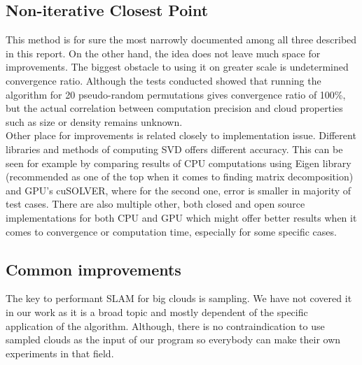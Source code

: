 \documentclass[titlepage]{article}
\begin{document}
\subsection{Non-iterative Closest Point}
This method is for sure the most narrowly documented among all three described in this report. On the other hand, the idea does not leave much space for improvements. The biggest obstacle to using it on greater scale is undetermined convergence ratio. Although the tests conducted showed that running the algorithm for 20 pseudo-random permutations gives convergence ratio of 100\%, but the actual correlation between computation precision and cloud properties such as size or density remains unknown.\\
Other place for improvements is related closely to implementation issue. Different libraries and methods of computing SVD offers different accuracy. This can be seen for example by comparing results of CPU computations using Eigen library (recommended as one of the top when it comes to finding matrix decomposition) and GPU's cuSOLVER, where for the second one, error is smaller in majority of test cases. There are also multiple other, both closed and open source implementations for both CPU and GPU which might offer better results when it comes to convergence or computation time, especially for some specific cases.

\subsection{Common improvements}
The key to performant SLAM for big clouds is sampling. We have not covered it in our work as it is a broad topic and mostly dependent of the specific application of the algorithm. Although, there is no contraindication to use sampled clouds as the input of our program so everybody can make their own experiments in that field.

\newpage
\printbibliography
\end{document}
